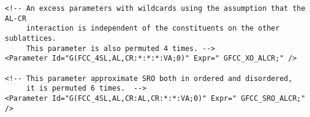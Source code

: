 \documentclass[preprint,review,12pt]{elsarticle}
\begin{document}
\begin{appendix}
{\begin{verbatim}
<!-- An excess parameters with wildcards using the assumption that the AL-CR
     interaction is independent of the constituents on the other sublattices.
     This parameter is also permuted 4 times. -->
<Parameter Id="G(FCC_4SL,AL,CR:*:*:*:VA;0)" Expr=" GFCC_XO_ALCR;" />

<!-- This parameter approximate SRO both in ordered and disordered,
     it is permuted 6 times.  -->
<Parameter Id="G(FCC_4SL,AL,CR:AL,CR:*:*:VA;0)" Expr=" GFCC_SRO_ALCR;" />

\end{verbatim}
}


\end{appendix}
\end{document}
